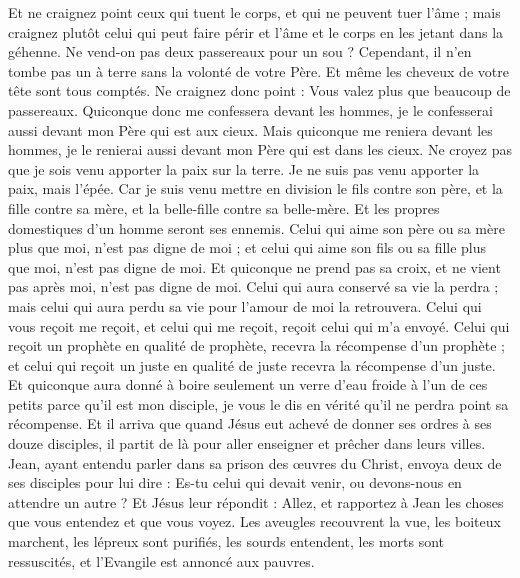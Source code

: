 \begin{multicols}{2}
Et ne craignez point ceux qui tuent le corps, et qui ne peuvent tuer l'âme ; mais craignez plutôt celui qui peut faire périr et l'âme et le corps en les jetant dans la géhenne.
Ne vend-on pas deux passereaux pour un sou ? Cependant, il n'en tombe pas un à terre sans la volonté de votre Père.
Et même les cheveux de votre tête sont tous comptés.
Ne craignez donc point : Vous valez plus que beaucoup de passereaux.
Quiconque donc me confessera devant les hommes, je le confesserai aussi devant mon Père qui est aux cieux.
Mais quiconque me reniera devant les hommes, je le renierai aussi devant mon Père qui est dans les cieux.
Ne croyez pas que je sois venu apporter la paix sur la terre. Je ne suis pas venu apporter la paix, mais l'épée.
Car je suis venu mettre en division le fils contre son père, et la fille contre sa mère, et la belle-fille contre sa belle-mère.
Et les propres domestiques d'un homme seront ses ennemis.
Celui qui aime son père ou sa mère plus que moi, n'est pas digne de moi ; et celui qui aime son fils ou sa fille plus que moi, n'est pas digne de moi.
Et quiconque ne prend pas sa croix, et ne vient pas après moi, n'est pas digne de moi.
Celui qui aura conservé sa vie la perdra ; mais celui qui aura perdu sa vie pour l'amour de moi la retrouvera.
Celui qui vous reçoit me reçoit, et celui qui me reçoit, reçoit celui qui m'a envoyé.
Celui qui reçoit un prophète en qualité de prophète, recevra la récompense d'un prophète ; et celui qui reçoit un juste en qualité de juste recevra la récompense d'un juste.
Et quiconque aura donné à boire seulement un verre d'eau froide à l'un de ces petits parce qu'il est mon disciple, je vous le dis en vérité qu'il ne perdra point sa récompense.
\VerseOne{}Et il arriva que quand Jésus eut achevé de donner ses ordres à ses douze disciples, il partit de là pour aller enseigner et prêcher dans leurs villes.
Jean, ayant entendu parler dans sa prison des œuvres du Christ, envoya deux de ses disciples pour lui dire :
Es-tu celui qui devait venir, ou devons-nous en attendre un autre ?
Et Jésus leur répondit : Allez, et rapportez à Jean les choses que vous entendez et que vous voyez.
Les aveugles recouvrent la vue, les boiteux marchent, les lépreux sont purifiés, les sourds entendent, les morts sont ressuscités, et l'Evangile est annoncé aux pauvres.

\end{multicols}
